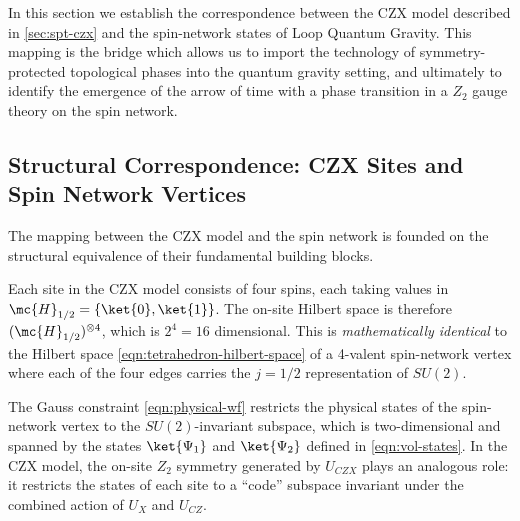 
In this section we establish the correspondence between the CZX model described in \autoref{sec:spt-czx} and the spin-network states of Loop Quantum Gravity. This mapping is the bridge which allows us to import the technology of symmetry-protected topological phases into the quantum gravity setting, and ultimately to identify the emergence of the arrow of time with a phase transition in a $ Z_2 $ gauge theory on the spin network.

\subsection{Structural Correspondence: CZX Sites and Spin Network Vertices}\label{subsec:czx-lqg-correspondence}

The mapping between the CZX model and the spin network is founded on the structural equivalence of their fundamental building blocks.

Each site in the CZX model consists of four spins, each taking values in $ \mc{H}_{1/2} = \{ \ket{0}, \ket{1} \} $. The on-site Hilbert space is therefore $ (\mc{H}_{1/2})^{\otimes 4} $, which is $ 2^4 = 16 $ dimensional. This is \emph{mathematically identical} to the Hilbert space \eqref{eqn:tetrahedron-hilbert-space} of a 4-valent spin-network vertex where each of the four edges carries the $ j = 1/2 $ representation of $ SU(2) $.

The Gauss constraint \eqref{eqn:physical-wf} restricts the physical states of the spin-network vertex to the $ SU(2) $-invariant subspace, which is two-dimensional and spanned by the states $ \ket{\Psi_1} $ and $ \ket{\Psi_2} $ defined in \eqref{eqn:vol-states}. In the CZX model, the on-site $ Z_2 $ symmetry generated by $ U_{CZX} $ plays an analogous role: it restricts the states of each site to a ``code'' subspace invariant under the combined action of $ U_X $ and $ U_{CZ} $.


